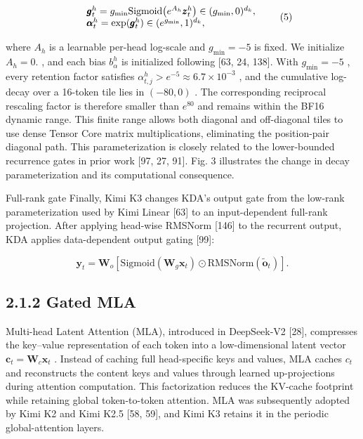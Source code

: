 \documentclass[
  10
]{article}
\begin{document}
\[
\begin{array}{r l} & {\pmb {g} _ {t} ^ {h} = g _ {\mathrm{min}} \mathrm{Sigmoid} \big (e ^ {A _ {h}} \pmb {z} _ {t} ^ {h} \big) \in (g _ {\mathrm{min}}, 0) ^ {d _ {k}},} \\ & {\pmb {\alpha} _ {t} ^ {h} = \exp (\pmb {g} _ {t} ^ {h}) \in (e ^ {g _ {\mathrm{min}}}, 1) ^ {d _ {k}},} \end{array}\tag{5}
\]

where \(A _ { h }\) is a learnable per-head log-scale and
\(g _ { \mathrm { m i n } } = - 5\) is fixed. We initialize
\(A _ { h } = 0 .\) , and each bias \(b _ { \alpha } ^ { h }\) is
initialized following {[}63, 24, 138{]}. With
\(g _ { \mathrm { m i n } } = - 5\) , every retention factor satisfies
\(\alpha _ { t , j } ^ { h } > e ^ { - 5 } \approx 6 . 7 \times 1 0 ^ { - 3 }\)
, and the cumulative log-decay over a 16-token tile lies in
\(( - 8 0 , 0 )\) . The corresponding reciprocal rescaling factor is
therefore smaller than \(e ^ { 8 0 }\) and remains within the BF16
dynamic range. This finite range allows both diagonal and off-diagonal
tiles to use dense Tensor Core matrix multiplications, eliminating the
position-pair diagonal path. This parameterization is closely related to
the lower-bounded recurrence gates in prior work {[}97, 27, 91{]}. Fig.
3 illustrates the change in decay parameterization and its computational
consequence.

Full-rank gate Finally, Kimi K3 changes KDA's output gate from the
low-rank parameterization used by Kimi Linear {[}63{]} to an
input-dependent full-rank projection. After applying head-wise RMSNorm
{[}146{]} to the recurrent output, KDA applies data-dependent output
gating {[}99{]}:

\[
\boldsymbol {y} _ {t} = \mathbf {W} _ {o} [ \mathrm{Sigmoid} (\mathbf {W} _ {g} \boldsymbol {x} _ {t}) \odot \mathrm{RMSNorm} (\tilde {\boldsymbol {o}} _ {t}) ].\tag{6}
\]

\subsection{2.1.2 Gated MLA}\label{gated-mla}

Multi-head Latent Attention (MLA), introduced in DeepSeek-V2 {[}28{]},
compresses the key--value representation of each token into a
low-dimensional latent vector
\(\pmb { c } _ { t } = \mathbf { W } _ { c } \pmb { x } _ { t }\) .
Instead of caching full head-specific keys and values, MLA caches
\(c _ { t }\) and reconstructs the content keys and values through
learned up-projections during attention computation. This factorization
reduces the KV-cache footprint while retaining global token-to-token
attention. MLA was subsequently adopted by Kimi K2 and Kimi K2.5 {[}58,
59{]}, and Kimi K3 retains it in the periodic global-attention layers.
\end{document}
